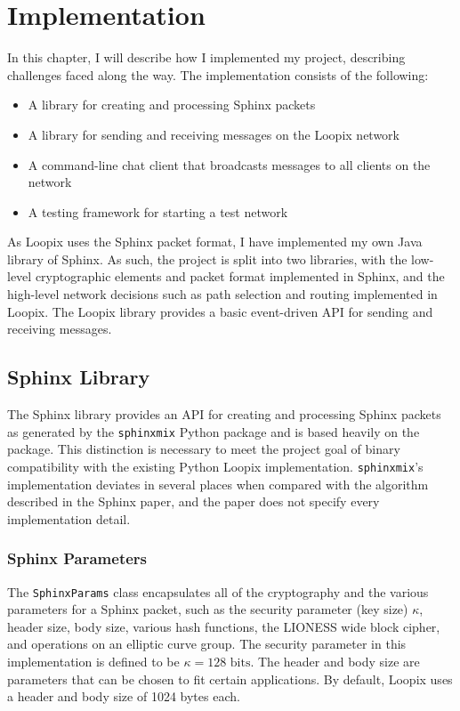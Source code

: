 \documentclass[final,dissertation.tex]{subfiles}
\begin{document}
\chapter{Implementation}

In this chapter, I will describe how I implemented my project, describing challenges faced along the way. The implementation consists of the following:

\begin{itemize}
	\item A library for creating and processing Sphinx packets
	\item A library for sending and receiving messages on the Loopix network
	\item A command-line chat client that broadcasts messages to all clients on the network
	\item A testing framework for starting a test network
\end{itemize}

As Loopix uses the Sphinx packet format, I have implemented my own Java library of Sphinx. As such, the project is split into two libraries, with the low-level cryptographic elements and packet format implemented in Sphinx, and the high-level network decisions such as path selection and routing implemented in Loopix. The Loopix library provides a basic event-driven API for sending and receiving messages.

\section{Sphinx Library}

The Sphinx library provides an API for creating and processing Sphinx packets as generated by the \verb|sphinxmix| Python package and is based heavily on the package. This distinction is necessary to meet the project goal of binary compatibility with the existing Python Loopix implementation. \verb|sphinxmix|'s implementation deviates in several places when compared with the algorithm described in the Sphinx paper, and the paper does not specify every implementation detail.

\subsection{Sphinx Parameters}

The \verb|SphinxParams| class encapsulates all of the cryptography and the various parameters for a Sphinx packet, such as the security parameter (key size) $\kappa$, header size, body size, various hash functions, the LIONESS wide block cipher, and operations on an elliptic curve group. The security parameter in this implementation is defined to be $\kappa = 128\text{ bits}$. The header and body size are parameters that can be chosen to fit certain applications. By default, Loopix uses a header and body size of 1024 bytes each.
\end{document}
